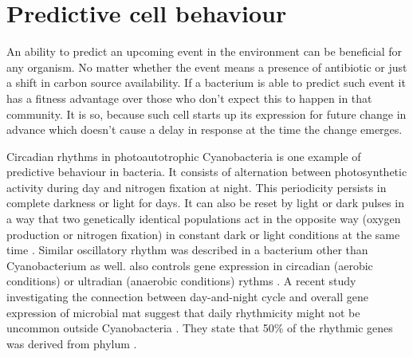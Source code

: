 
\section{Predictive cell behaviour}
An ability to predict an upcoming event in the environment can be beneficial for any organism.
No matter whether the event means a presence of antibiotic or just a shift in carbon source availability.
If a bacterium is able to predict such event it has a fitness advantage over those who don't expect this to happen in that community.
It is so, because such cell starts up its expression for future change in advance which doesn't cause a delay in response at the time the change emerges.

Circadian rhythms in photoautotrophic Cyanobacteria is one example of predictive behaviour in bacteria.
It consists of alternation between photosynthetic activity during day and nitrogen fixation at night.
This periodicity persists in complete darkness or light for days.
It can also be reset by light or dark pulses in a way that two genetically identical populations act in the opposite way (oxygen production or nitrogen fixation) in constant dark or light conditions at the same time \cite{kondo1993circadian}.
Similar oscillatory rhythm was described in a bacterium other than Cyanobacterium as well.
 also controls gene expression in circadian (aerobic conditions) or ultradian (anaerobic conditions) rythms \cite{min2005rhythmic}.
A recent study investigating the connection between day-and-night cycle and overall gene expression of microbial mat suggest that daily rhythmicity might not be uncommon outside Cyanobacteria \cite{hornlein2018daily}.
They state that 50\% of the rhythmic genes was derived from phylum .

